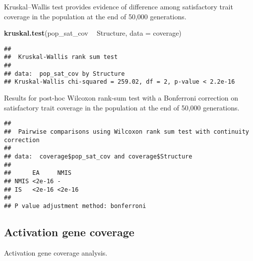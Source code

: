 \documentclass[]{book}
\newenvironment{Shaded}{\begin{snugshade}}{\end{snugshade}}
\newcommand{\DataTypeTok}[1]{\textcolor[rgb]{0.13,0.29,0.53}{#1}}
\newcommand{\KeywordTok}[1]{\textcolor[rgb]{0.13,0.29,0.53}{\textbf{#1}}}
\newcommand{\NormalTok}[1]{#1}
\newcommand{\OperatorTok}[1]{\textcolor[rgb]{0.81,0.36,0.00}{\textbf{#1}}}
\newcommand{\OtherTok}[1]{\textcolor[rgb]{0.56,0.35,0.01}{#1}}
\newcommand{\StringTok}[1]{\textcolor[rgb]{0.31,0.60,0.02}{#1}}
\begin{document}
Kruskal--Wallis test provides evidence of difference among satisfactory trait coverage in the population at the end of 50,000 generations.

\begin{Shaded}
\begin{Highlighting}[]
\KeywordTok{kruskal.test}\NormalTok{(pop_sat_cov }\OperatorTok{~}\StringTok{ }\NormalTok{Structure, }\DataTypeTok{data =}\NormalTok{ coverage)}
\end{Highlighting}
\end{Shaded}

\begin{verbatim}
## 
##  Kruskal-Wallis rank sum test
## 
## data:  pop_sat_cov by Structure
## Kruskal-Wallis chi-squared = 259.02, df = 2, p-value < 2.2e-16
\end{verbatim}

Results for post-hoc Wilcoxon rank-sum test with a Bonferroni correction on satisfactory trait coverage in the population at the end of 50,000 generations.

\begin{Shaded}
\end{Shaded}

\begin{verbatim}
## 
##  Pairwise comparisons using Wilcoxon rank sum test with continuity correction 
## 
## data:  coverage$pop_sat_cov and coverage$Structure 
## 
##      EA     NMIS  
## NMIS <2e-16 -     
## IS   <2e-16 <2e-16
## 
## P value adjustment method: bonferroni
\end{verbatim}

\hypertarget{activation-gene-coverage-14}{%
\subsection{Activation gene coverage}\label{activation-gene-coverage-14}}

Activation gene coverage analysis.
\end{document}
